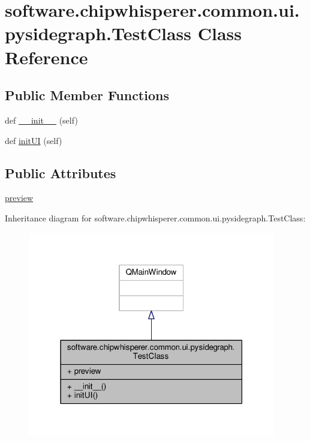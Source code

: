 \hypertarget{classsoftware_1_1chipwhisperer_1_1common_1_1ui_1_1pysidegraph_1_1TestClass}{}\section{software.\+chipwhisperer.\+common.\+ui.\+pysidegraph.\+Test\+Class Class Reference}
\label{classsoftware_1_1chipwhisperer_1_1common_1_1ui_1_1pysidegraph_1_1TestClass}
\subsection*{Public Member Functions}
\begin{DoxyCompactItemize}
\item 
def \hyperlink{classsoftware_1_1chipwhisperer_1_1common_1_1ui_1_1pysidegraph_1_1TestClass_aee5fde15fed673924d572d16b179a782}{\+\_\+\+\_\+init\+\_\+\+\_\+} (self)
\item 
def \hyperlink{classsoftware_1_1chipwhisperer_1_1common_1_1ui_1_1pysidegraph_1_1TestClass_aa66e4623ba95f4fb3717799a71b97555}{init\+U\+I} (self)
\end{DoxyCompactItemize}
\subsection*{Public Attributes}
\begin{DoxyCompactItemize}
\item 
\hyperlink{classsoftware_1_1chipwhisperer_1_1common_1_1ui_1_1pysidegraph_1_1TestClass_a7d86eba82a32bc11be54381ace60e91e}{preview}
\end{DoxyCompactItemize}


Inheritance diagram for software.\+chipwhisperer.\+common.\+ui.\+pysidegraph.\+Test\+Class\+:\nopagebreak
\begin{figure}[H]
\begin{center}
\leavevmode
\includegraphics[width=307pt]{d8/d53/classsoftware_1_1chipwhisperer_1_1common_1_1ui_1_1pysidegraph_1_1TestClass__inherit__graph}
\end{center}
\end{figure}


